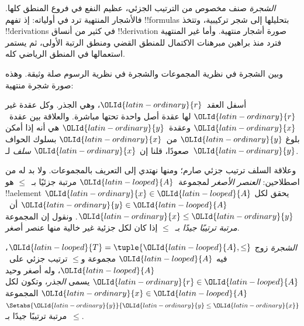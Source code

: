 \documentclass[../../../include/open-logic-section]{subfiles}
\begin{document}

\emph{الشجرة} صنف مخصوص من الترتيب الجزئي، عظيم النفع في فروع
المنطق كلها. فالأشجار المنتهية ترد في أولياته: إذ تفهم
!!{formula}s بتحليلها إلى شجر تركيبية، وتتخذ !!{derivation}s في
كثير من أنساق !!{derivation} صورة أشجار منتهية.
%
وأما غير المنتهية فترد منذ براهين مبرهنات الاكتمال للمنطق القضي
ومنطق الرتبة الأولى، ثم يستمر استعمالها في المنطق الرياضي كله.

وبين الشجرة في نظرية المجموعات والشجرة في نظرية الرسوم صلة وثيقة.
وهذه صورة شجرة منتهية:

\begin{center}
\end{center}

أسفل العقد~${\OLId{latin-ordinary}{r}}$، وهي الجذر. وكل عقدة غير ${\OLId{latin-ordinary}{r}}$ لها عقدة أصل واحدة
تحتها مباشرة. والعلاقة بين عقدة~${\OLId{latin-ordinary}{x}}$ وعقدة~${\OLId{latin-ordinary}{y}}$ هي أنه إذا أمكن بلوغ ${\OLId{latin-ordinary}{y}}$ من~${\OLId{latin-ordinary}{x}}$ بسلوك
الحواف صعودًا، قلنا إن ${\OLId{latin-ordinary}{x}}$ \emph{سلف} لـ~${\OLId{latin-ordinary}{y}}$.

وعلاقة السلف ترتيب جزئي صارم؛ ومنها نهتدي إلى التعريف بالمجموعات.
ولا بد له من اصطلاحين: \emph{العنصر الأصغر} لمجموعة~${\OLId{latin-looped}{A}}$ مرتبة
جزئيًا بـ~$\le$ هو !!a{element} ${\OLId{latin-ordinary}{x}} \in {\OLId{latin-looped}{A}}$ يحقق لكل ${\OLId{latin-ordinary}{y}} \in {\OLId{latin-looped}{A}}$
أن~${\OLId{latin-ordinary}{x}} \le {\OLId{latin-ordinary}{y}}$. ونقول إن المجموعة \emph{مرتبة ترتيبًا جيدًا}
بـ~$\le$ إذا كان لكل جزئية غير خالية منها عنصر أصغر.

\begin{defn}[الشجرة]
\emph{الشجرة} زوج ${\OLId{latin-looped}{T}} = \tuple{{\OLId{latin-looped}{A}}, \le}$، فيه ${\OLId{latin-looped}{A}}$ مجموعة و$\le$
ترتيب جزئي على~${\OLId{latin-looped}{A}}$، وله أصغر وحيد ${\OLId{latin-ordinary}{r}} \in {\OLId{latin-looped}{A}}$ يسمى \emph{الجذر}،
وتكون لكل ${\OLId{latin-ordinary}{x}} \in {\OLId{latin-looped}{A}}$ المجموعة $\Setabs{{\OLId{latin-ordinary}{y}}}{{\OLId{latin-ordinary}{y}} \le {\OLId{latin-ordinary}{x}}}$ مرتبة ترتيبًا
جيدًا بـ~$\le$.
\end{defn}
\end{document}
